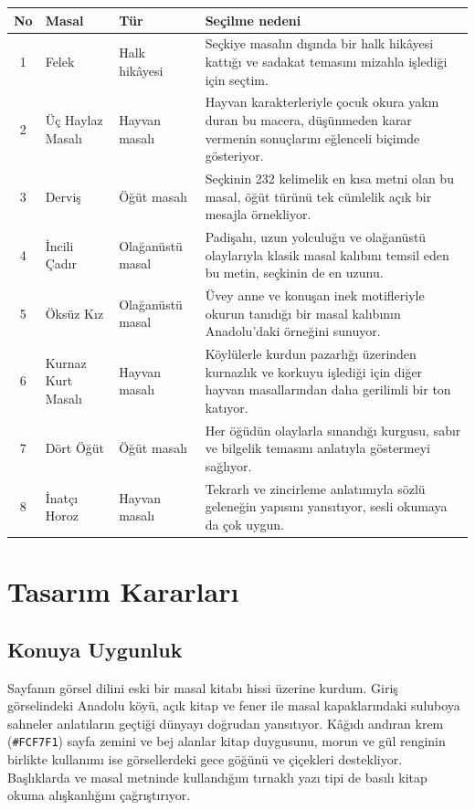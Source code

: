 \documentclass[12pt,a4paper]{article}
\begin{document}
\begin{longtable}{@{}cp{4cm}p{3cm}p{5.4cm}@{}}
\toprule
\textbf{No} & \textbf{Masal} & \textbf{Tür} & \textbf{Seçilme nedeni} \\
\midrule
\endhead
1 & Felek & Halk hikâyesi & Seçkiye masalın dışında bir halk hikâyesi kattığı ve sadakat temasını mizahla işlediği için seçtim. \\
2 & Üç Haylaz Masalı & Hayvan masalı & Hayvan karakterleriyle çocuk okura yakın duran bu macera, düşünmeden karar vermenin sonuçlarını eğlenceli biçimde gösteriyor. \\
3 & Derviş & Öğüt masalı & Seçkinin 232 kelimelik en kısa metni olan bu masal, öğüt türünü tek cümlelik açık bir mesajla örnekliyor. \\
4 & İncili Çadır & Olağanüstü masal & Padişahı, uzun yolculuğu ve olağanüstü olaylarıyla klasik masal kalıbını temsil eden bu metin, seçkinin de en uzunu. \\
5 & Öksüz Kız & Olağanüstü masal & Üvey anne ve konuşan inek motifleriyle okurun tanıdığı bir masal kalıbının Anadolu'daki örneğini sunuyor. \\
6 & Kurnaz Kurt Masalı & Hayvan masalı & Köylülerle kurdun pazarlığı üzerinden kurnazlık ve korkuyu işlediği için diğer hayvan masallarından daha gerilimli bir ton katıyor. \\
7 & Dört Öğüt & Öğüt masalı & Her öğüdün olaylarla sınandığı kurgusu, sabır ve bilgelik temasını anlatıyla göstermeyi sağlıyor. \\
8 & İnatçı Horoz & Hayvan masalı & Tekrarlı ve zincirleme anlatımıyla sözlü geleneğin yapısını yansıtıyor, sesli okumaya da çok uygun. \\
\bottomrule
\end{longtable}

\section{Tasarım Kararları}
\subsection{Konuya Uygunluk}
Sayfanın görsel dilini eski bir masal kitabı hissi üzerine kurdum. Giriş görselindeki Anadolu köyü, açık kitap ve fener ile masal kapaklarındaki suluboya sahneler anlatıların geçtiği dünyayı doğrudan yansıtıyor. Kâğıdı andıran krem (\texttt{\#FCF7F1}) sayfa zemini ve bej alanlar kitap duygusunu, morun ve gül renginin birlikte kullanımı ise görsellerdeki gece göğünü ve çiçekleri destekliyor. Başlıklarda ve masal metninde kullandığım tırnaklı yazı tipi de basılı kitap okuma alışkanlığını çağrıştırıyor.
\end{document}
